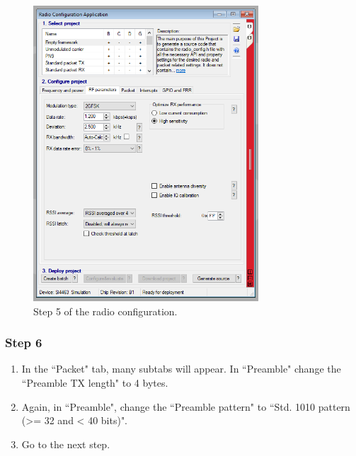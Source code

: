 \begin{figure}[!h]
	\begin{center}
		\includegraphics[width=0.75\textwidth]{figures/wds-tutorial-5.png}
		\caption{Step 5 of the radio configuration.}
		\label{fig:wds-tutorial-step-5}
	\end{center}
\end{figure}

\subsubsection{Step 6}

\begin{enumerate}
    \item In the ``Packet" tab, many subtabs will appear. In ``Preamble" change the ``Preamble TX length" to 4 bytes.
    \item Again, in ``Preamble", change the ``Preamble pattern" to ``Std. 1010 pattern (>= 32 and < 40 bits)".
    \item Go to the next step.
\end{enumerate}

